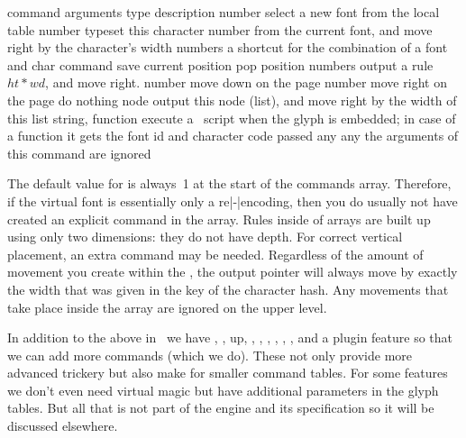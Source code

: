 \starttabulate[|l|l|l|p|]
\FL
\BC command          \BC arguments \BC type      \BC description \NC \NR
\ML
\NC {}               \NC number    \NC select a new font from the local  table \NC \NR
\NC {}               \NC number    \NC typeset this character number from the current font,
                                                     and move right by the character's width \NC \NR
\NC {}                numbers \NC a shortcut for the combination of a font and char command\NC \NR
\NC {}               \NC           \NC save current position\NC \NR
\NC {}                \NC           \NC pop position \NC \NR
\NC {}                numbers \NC output a rule $ht*wd$, and move right. \NC \NR
\NC {}               \NC number    \NC move down on the page \NC \NR
\NC {}              \NC number    \NC move right on the page \NC \NR
\HL
\NC {}                \NC           \NC do nothing \NC \NR
\NC {}               \NC node      \NC output this node (list), and move right
                                                     by the width of this list\NC \NR
\NC {}                \NC string,
                                       function  \NC execute a \LUA\ script when the glyph is embedded; in case of a
                                                     function it gets the font id and character code passed \NC \NR
\NC {}   \NC any       \NC any       \NC the arguments of this command are ignored \NC \NR
\LL
\stoptabulate

The default value for  is always~1 at the start of the \type
{commands} array. Therefore, if the virtual font is essentially only a
re|-|encoding, then you do usually not have created an explicit 
command in the array. Rules inside of  arrays are built up using
only two dimensions: they do not have depth. For correct vertical placement, an
extra  command may be needed. Regardless of the amount of movement
you create within the , the output pointer will always move by
exactly the width that was given in the  key of the character hash.
Any movements that take place inside the  array are ignored on
the upper level.

In addition to the above in \CONTEXT\ we have , , \type
{up}, , , , , ,
,  and a plugin feature so that we can add more
commands (which we do). These not only provide more advanced trickery but also
make for smaller command tables. For some features we don't even need virtual
magic but have additional parameters in the glyph tables. But all that is not
part of the engine and its specification so it will be discussed elsewhere.

